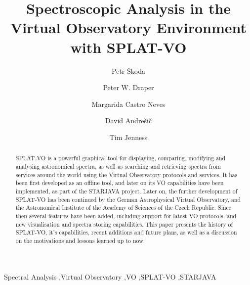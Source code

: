 \documentclass[final,authoryear,5p,times,twocolumn]{elsarticle}
\begin{document}
\begin{frontmatter}

\title{Spectroscopic Analysis in the Virtual Observatory Environment with SPLAT-VO}

\author[OND]{Petr \v{S}koda}
\author[DUR]{Peter W. Draper}
\author[HDB]{Margarida Castro Neves}
\author[VSB]{David Andre\v{s}i\v{c}}
\author[COR]{Tim Jenness}

\address[OND]{Astronomical Institute of the Academy of Sciences,Fri\v{c}ova~298, 251\,65, Ond\v{r}ejov, Czech Republic}
\address[DUR]{Department of Physics, Institute for Computational
Cosmology, University of Durham, South Road, Durham DH1 3LE, UK}
\address[HDB]{Universit\"a{}t Heidelberg, Astronomisches Rechen-Institut,
M\"o{}nchhofstra\ss{}e 12--14, 69120 Heidelberg, Germany}
\address[VSB]{Department of Computer Science, Faculty of Electrical
Engineering and Computer Science, V\v{S}B --- Technical University of Ostrava\\
 17. listopadu 15, 708 33 Ostrava-Poruba, Czech Republic}
\address[COR]{Department of Astronomy, Cornell University, Ithaca, NY 14853, USA}


\begin{abstract}
SPLAT-VO is a powerful graphical tool for displaying, comparing, modifying and analysing astronomical spectra, as well as searching and retrieving spectra from services around the world using the Virtual Observatory protocols and services. It has been first developed as an offline tool, and later on its VO capabilities have been implemented, as part of the STARJAVA project. Later on, the further development of SPLAT-VO has been continued by the German Astrophysical Virtual Observatory, and the Astronomical Institute of the Academy of Sciences of the Czech Republic. Since then several features have been added, including support for latest VO protocols, and new visualisation and spectra storing capabilities.  This paper presents the history of SPLAT-VO, it's capabilities, recent additions and future plans, as well as  a discussion on the motivations and lessons learned up to now.
\end{abstract}
\begin{keyword}
Spectral Analysis \sep Virtual Observatory \sep VO \sep SPLAT-VO \sep STARJAVA
\end{keyword}
\end{frontmatter}

\end{document}
